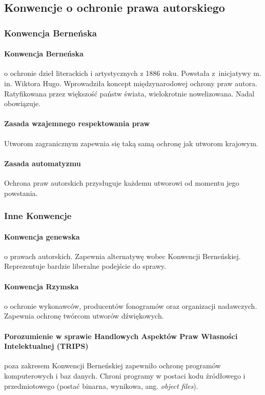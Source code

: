 \documentclass{article}
\begin{document}
\subsection{Konwencje o ochronie prawa autorskiego}

\subsubsection{Konwencja Berneńska}

\paragraph{Konwencja Berneńska}
o ochronie dzieł literackich i artystycznych z 1886 roku. Powstała z~inicjatywy m. in. Wiktora Hugo.
Wprowadziła koncept międzynarodowej ochrony praw autora.
Ratyfikowana przez większość państw świata, wielokrotnie nowelizowana. Nadal obowiązuje.

\paragraph{Zasada wzajemnego respektowania praw} Utworom zagranicznym zapewnia się taką samą ochronę jak utworom krajowym.

\paragraph{Zasada automatyzmu}
Ochrona praw autorskich przysługuje każdemu utworowi od momentu jego powstania.

\subsubsection{Inne Konwencje}

\paragraph{Konwencja genewska} o prawach autorskich.
Zapewnia alternatywę wobec Konwencji Berneńskiej.
Reprezentuje bardzie liberalne podejście do sprawy.

\paragraph{Konwencja Rzymska}
o ochronie wykonawców, producentów fonogramów oraz organizacji nadawczych.
Zapewnia ochronę twórcom utworów dźwiękowych.

\paragraph{Porozumienie w sprawie Handlowych Aspektów Praw Własności Intelektualnej (TRIPS)}
poza zakresem Konwencji Berneńskiej zapewniło ochronę programów komputerowych i baz danych.
Chroni programy w postaci kodu źródłowego i przedmiotowego (postać binarna, wynikowa, ang. \textit{object files}).
\end{document}

